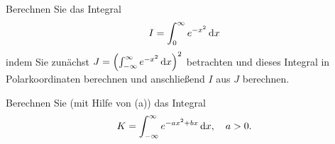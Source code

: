 \documentclass{atistandalonetask}
\begin{document}
  \begin{atiTask}[
    title = \textsc{Gauß}sche Integrale
  ]
    \begin{atiSubtasks}
    	\item Berechnen Sie das Integral
    	\[
    	I=\int_{0}^{\infty} e^{-x^2}\,\mathrm{d} x
    	\]
    	indem Sie zunächst $J=\left(\int_{-\infty}^{\infty} e^{-x^2}\,\mathrm{d} x\right)^2$ betrachten und dieses Integral in Polarkoordinaten berechnen und anschließend $I$ aus $J$ berechnen.
    	\item Berechnen Sie (mit Hilfe von (a)) das Integral
    	\[
    	K=\int_{-\infty}^{\infty} e^{-ax^2+bx}\,\mathrm{d} x,\quad a>0.
    	\]
    \end{atiSubtasks}	
  \end{atiTask}
  \begin{atiSolution}
	 
  \end{atiSolution}
\end{document}
